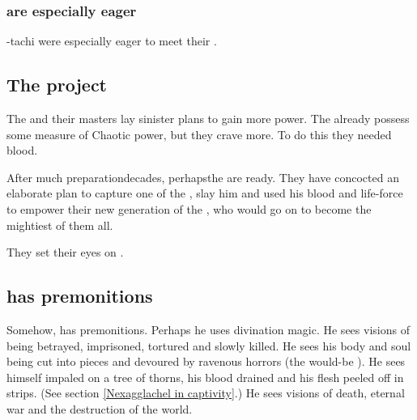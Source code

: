 \subsubsection{\Mystraacht{} are especially eager}
\Zachirah-tachi were especially eager to meet their \banelords. 










\subsection{The \Sathariah{} project}
The \resphain{} and their \bane{} masters lay sinister plans to gain more power. The \resphain{} already possess some measure of Chaotic power, but they crave more. To do this they needed \draconic{} blood. 

After much preparation\dash decades, perhaps\dash the \resphain{} are ready. They have concocted an elaborate plan to capture one of the \shaeeroths{}, slay him and used his blood and life-force to empower their new generation of \resphain\dash the , who would go on to become the mightiest of them all. 

They set their eyes on \Ishnaruchaefir.







\subsection{\Ishnaruchaefir{} has premonitions}
Somehow, \Ishnaruchaefir{} has premonitions. 
Perhaps he uses divination magic. 
He sees visions of being betrayed, imprisoned, tortured and slowly killed. 
He sees his body and soul being cut into pieces and devoured by ravenous horrors (the would-be \satharioth). 
He sees himself impaled on a tree of thorns, his blood drained and his flesh peeled off in strips. (See section \ref{Nexagglachel in captivity}.) 
He sees visions of death, eternal war and the destruction of the world. 

